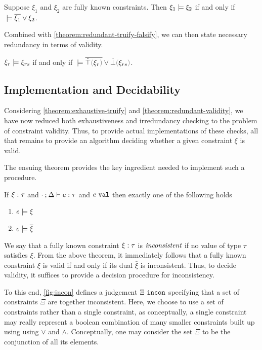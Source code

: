 \begin{lemma}
	\label{lemma:material-entailment}
	Suppose $\xi_1$ and $\xi_2$ are fully known constraints. Then $\xi_1 \models \xi_2$ if and only if $\; \models \overline{\xi_1} \vee \xi_2$.
\end{lemma}

Combined with \autoref{theorem:redundant-truify-falsify}, we can then state necessary redundancy in terms of validity.

\begin{theorem}
	\label{theorem:redundant-validity}
	$\xi_r \models \xi_{rs}$ if and only if $\ccsatisfy{\;}{\cor{\cdual{\ctruify{\xi_r}}}{\cfalsify{\xi_{rs}}}}$.
\end{theorem}

\subsection{Implementation and Decidability}\label{sec:decidability}
Considering \autoref{theorem:exhaustive-truify} and \autoref{theorem:redundant-validity}, we have now reduced both exhaustiveness and irredundancy checking to the problem of constraint validity. Thus, to provide actual implementations of these checks, all that remains to provide an algorithm deciding whether a given constraint $\xi$ is valid. 

The ensuing theorem provides the key ingredient needed to implement such a procedure.

\begin{theorem}
	\label{theorem:exclusive-complete-constraint-satisfaction}
	If $\xi : \tau$ and $\cdot \mathbin{;} \Delta \vdash e : \tau$ and $e ~\mathtt{val}$ then exactly one of the following holds
	\begin{enumerate}
		\item $e \models \xi$
		\item $e \models \overline{\xi}$
	\end{enumerate}
\end{theorem}

We say that a fully known constraint $\xi : \tau$ is $\emph{inconsistent}$ if no value of type $\tau$ satisfies $\xi$. From the above theorem, it immediately follows that a fully known constraint $\xi$ is valid if and only if its dual $\bar{\xi}$ is inconsistent. Thus, to decide validity, it suffices to provide a decision procedure for inconsistency. 

To this end, \autoref{fig:incon} defines a judgement  $\Xi ~\mathtt{incon}$ specifying that a set of constraints $\Xi$ are together inconsistent. Here, we choose to use a set of constraints rather than a single constraint, as conceptually, a single constraint may really represent a boolean combination of many smaller constraints built up using using $\lor$ and $\land$. Conceptually, one may consider the set $\Xi$ to be the conjunction of all its elements.

